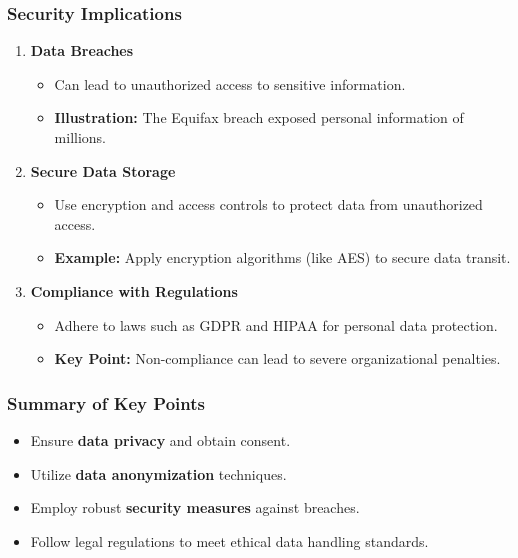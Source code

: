 \documentclass{beamer}
\begin{document}
\begin{frame}[fragile]
    \frametitle{Security Implications}
    \begin{enumerate}
        \item \textbf{Data Breaches}
        \begin{itemize}
            \item Can lead to unauthorized access to sensitive information.
            \item \textbf{Illustration:} The Equifax breach exposed personal information of millions.
        \end{itemize}

        \item \textbf{Secure Data Storage}
        \begin{itemize}
            \item Use encryption and access controls to protect data from unauthorized access.
            \item \textbf{Example:} Apply encryption algorithms (like AES) to secure data transit.
        \end{itemize}

        \item \textbf{Compliance with Regulations}
        \begin{itemize}
            \item Adhere to laws such as GDPR and HIPAA for personal data protection.
            \item \textbf{Key Point:} Non-compliance can lead to severe organizational penalties.
        \end{itemize}
    \end{enumerate}
\end{frame}

\begin{frame}[fragile]
    \frametitle{Summary of Key Points}
    \begin{itemize}
        \item Ensure \textbf{data privacy} and obtain consent.
        \item Utilize \textbf{data anonymization} techniques.
        \item Employ robust \textbf{security measures} against breaches.
        \item Follow legal regulations to meet ethical data handling standards.
    \end{itemize}
\end{frame}
\end{document}
